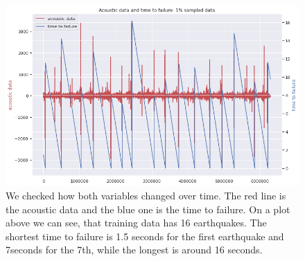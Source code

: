 \documentclass[]{llncs}
\begin{document}
\begin{figure}[h]
	\centering
	\includegraphics[width=0.8\linewidth]{../GPUProject/timeSeries}
	\caption{We checked how both variables changed over time. The red line is the acoustic data and the blue one is the time to failure. On a plot above we can see, that training data has 16 earthquakes. The shortest time to failure is 1.5 seconds for the first earthquake and 7seconds for the 7th, while the longest is around 16 seconds.}
	\label{fig:timeseries}
\end{figure}
\end{document}
